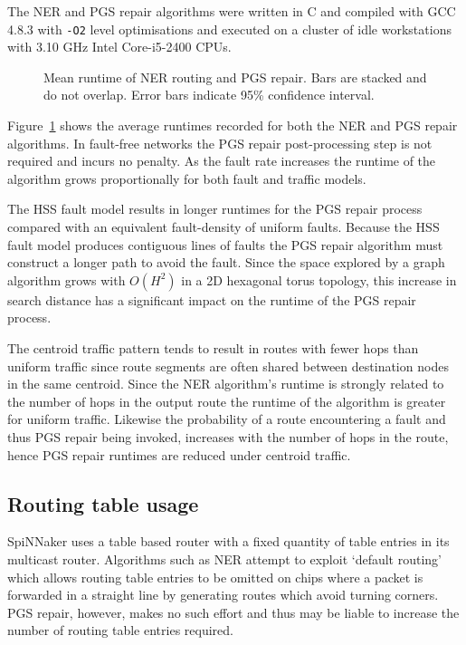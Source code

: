			The NER and PGS repair algorithms were written in C and compiled with GCC
			4.8.3 with \verb|-O2| level optimisations and executed on a cluster of
			idle workstations with 3.10 GHz Intel Core-i5-2400 CPUs.
			
			\begin{figure}
				\center
				
				\caption[Mean runtime of NER routing and PGS repair.]%
				{Mean runtime of NER routing and PGS repair. Bars are stacked
				and do not overlap. Error bars indicate 95\% confidence interval.}
				\label{fig:routing-runtimes}
			\end{figure}
			
			Figure~\ref{fig:routing-runtimes} shows the average runtimes recorded for
			both the NER and PGS repair algorithms. In fault-free networks the
			PGS repair post-processing step is not required and incurs no penalty. As
			the fault rate increases the runtime of the algorithm grows
			proportionally for both fault and traffic models.
			
			The HSS fault model results in longer runtimes for the PGS repair process
			compared with an equivalent fault-density of uniform faults.  Because the
			HSS fault model produces contiguous lines of faults the PGS repair
			algorithm must construct a longer path to avoid the fault.  Since the
			space explored by a graph algorithm grows with $O(H^2)$ in a 2D hexagonal
			torus topology, this increase in search distance has a significant impact
			on the runtime of the PGS repair process.
			
			The centroid traffic pattern tends to result in routes with fewer hops
			than uniform traffic since route segments are often shared between
			destination nodes in the same centroid.  Since the NER algorithm's
			runtime is strongly related to the number of hops in the output route the
			runtime of the algorithm is greater for uniform traffic.  Likewise the
			probability of a route encountering a fault and thus PGS repair being
			invoked, increases with the number of hops in the route, hence PGS repair
			runtimes are reduced under centroid traffic.
		
		\subsection{Routing table usage}
			
			SpiNNaker uses a table based router with a fixed quantity of table
			entries in its multicast router. Algorithms such as NER attempt to
			exploit `default routing' which allows routing table entries to be
			omitted on chips where a packet is forwarded in a straight line by
			generating routes which avoid turning corners.  PGS repair, however,
			makes no such effort and thus may be liable to increase the number of
			routing table entries required.
			
